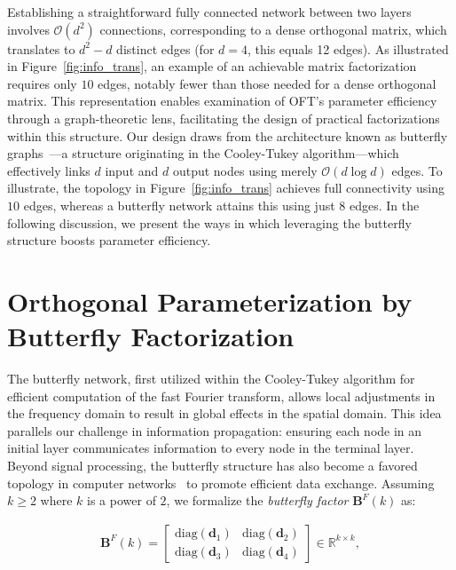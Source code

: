 Establishing a straightforward fully connected network between two layers involves $\mathcal{O}(d^2)$ connections, corresponding to a dense orthogonal matrix, which translates to $d^2-d$ distinct edges (for $d=4$, this equals 12 edges). As illustrated in Figure~\ref{fig:info_trans}, an example of an achievable matrix factorization requires only $10$ edges, notably fewer than those needed for a dense orthogonal matrix. This representation enables examination of OFT's parameter efficiency through a graph-theoretic lens, facilitating the design of practical factorizations within this structure. Our design draws from the architecture known as butterfly graphs~\cite{cooley1965algorithm}—a structure originating in the Cooley-Tukey algorithm—which effectively links $d$ input and $d$ output nodes using merely $\mathcal{O}(d\log d)$ edges. To illustrate, the topology in Figure~\ref{fig:info_trans} achieves full connectivity using $10$ edges, whereas a butterfly network attains this using just $8$ edges. In the following discussion, we present the ways in which leveraging the butterfly structure boosts parameter efficiency.

\section{Orthogonal Parameterization by Butterfly Factorization}

The butterfly network, first utilized within the Cooley-Tukey algorithm for efficient computation of the fast Fourier transform, allows local adjustments in the frequency domain to result in global effects in the spatial domain. This idea parallels our challenge in information propagation: ensuring each node in an initial layer communicates information to every node in the terminal layer. Beyond signal processing, the butterfly structure has also become a favored topology in computer networks~\cite{solihin2015fundamentals,li2011linear} to promote efficient data exchange. Assuming $k\geq 2$ where $k$ is a power of $2$, we formalize the \emph{butterfly factor} $\bm{B}^F(k)$ as:

\begin{equation}\label{eq:but_factor}
\begin{aligned}
    \bm{B}^F(k)=\begin{bmatrix}
    \text{diag}(\bm{d}_1) & \text{diag}(\bm{d}_2) \\
    \text{diag}(\bm{d}_3) & \text{diag}(\bm{d}_4)
    \end{bmatrix}\in\mathbb{R}^{k\times k},
\end{aligned}
\end{equation}

